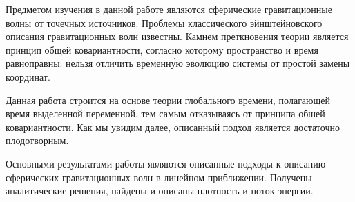 \documentclass[\docroot/reports/draft/report.tex]{subfiles}
\begin{document}
\onlyinsubfile{\tableofcontents}

Предметом изучения в данной работе являются сферические гравитационные волны от точечных источников. Проблемы классического эйнштейновского описания гравитационных волн известны. Камнем преткновения теории является принцип общей ковариантности, согласно которому пространство и время равноправны: нельзя отличить временн\'{у}ю эволюцию системы от простой замены координат.

Данная работа строится на основе теории глобального времени, полагающей время выделенной переменной, тем самым отказываясь от принципа обшей ковариантности. Как мы увидим далее, описанный подход является достаточно плодотворным.

Основными результатами работы являются описанные подходы к описанию сферических гравитационных волн в линейном приближении. Получены аналитические решения, найдены и описаны плотность и поток энергии.
\end{document}
